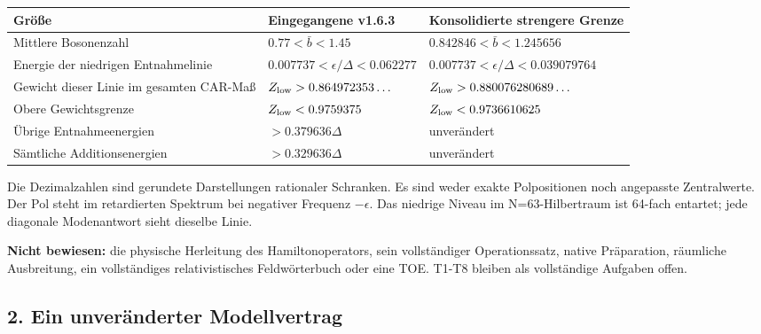 {\def\LTcaptype{none} %
\begin{longtable}[]{@{}
  >{\raggedright\arraybackslash}p{}
  >{\raggedleft\arraybackslash}p{}
  >{\raggedleft\arraybackslash}p{}@{}}
\toprule\noalign{}
\begin{minipage}[b]{\linewidth}\raggedright
Größe
\end{minipage} & \begin{minipage}[b]{\linewidth}\raggedleft
Eingegangene v1.6.3
\end{minipage} & \begin{minipage}[b]{\linewidth}\raggedleft
Konsolidierte strengere Grenze
\end{minipage} \\
\midrule\noalign{}
\endhead
\bottomrule\noalign{}
\endlastfoot
Mittlere Bosonenzahl & \(0.77<\bar b<1.45\) &
\(0.842846<\bar b<1.245656\) \\
Energie der niedrigen Entnahmelinie &
\(0.007737<\epsilon/\Delta<0.062277\) &
\(0.007737<\epsilon/\Delta<0.039079764\) \\
Gewicht dieser Linie im gesamten CAR-Maß &
\(Z_{\rm low}>0.864972353\ldots\) &
\(Z_{\rm low}>0.880076280689\ldots\) \\
Obere Gewichtsgrenze & \(Z_{\rm low}<0.9759375\) &
\(Z_{\rm low}<0.9736610625\) \\
Übrige Entnahmeenergien & \(>0.379636\Delta\) & unverändert \\
Sämtliche Additionsenergien & \(>0.329636\Delta\) & unverändert \\
\end{longtable}
}

Die Dezimalzahlen sind gerundete Darstellungen rationaler Schranken. Es
sind weder exakte Polpositionen noch angepasste Zentralwerte. Der Pol
steht im retardierten Spektrum bei negativer Frequenz \(-\epsilon\). Das
niedrige Niveau im N=63-Hilbertraum ist 64-fach entartet; jede diagonale
Modenantwort sieht dieselbe Linie.

\textbf{Nicht bewiesen:} die physische Herleitung des Hamiltonoperators,
sein vollständiger Operationssatz, native Präparation, räumliche
Ausbreitung, ein vollständiges relativistisches Feldwörterbuch oder eine
TOE. T1-T8 bleiben als vollständige Aufgaben offen.

\subsection{2. Ein unveränderter
Modellvertrag}\label{ein-unveruxe4nderter-modellvertrag}

